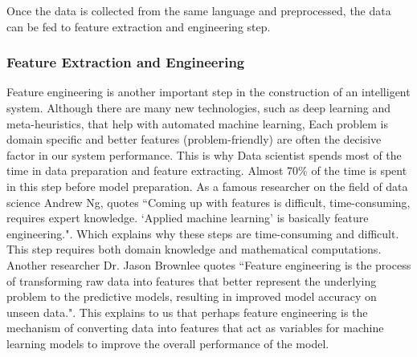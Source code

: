 Once the data is collected from the same language and preprocessed, the data can be fed to feature extraction and engineering step.

\subsubsection{Feature Extraction and Engineering} \label{backgroundworkFeatureEngi}

Feature engineering is another important step in the construction of an intelligent system. Although there are many new technologies, such as deep learning and meta-heuristics, that help with automated machine learning, Each problem is domain specific and better features (problem-friendly) are often the decisive factor in our system performance. This is why Data scientist spends most of the time in data preparation and feature extracting. Almost 70\% of the time is spent in this step before model preparation. As a famous researcher on the field of data science Andrew Ng, quotes ``Coming up with features is difficult, time-consuming, requires expert knowledge. `Applied machine learning' is basically feature engineering.". Which explains why these steps are time-consuming and difficult. This step requires both domain knowledge and mathematical computations. Another researcher Dr. Jason Brownlee quotes ``Feature engineering is the process of transforming raw data into features that better represent the underlying problem to the predictive models, resulting in improved model accuracy on unseen data.". This explains to us that perhaps feature engineering is the mechanism of converting data into features that act as variables for machine learning models to improve the overall performance of the model.


